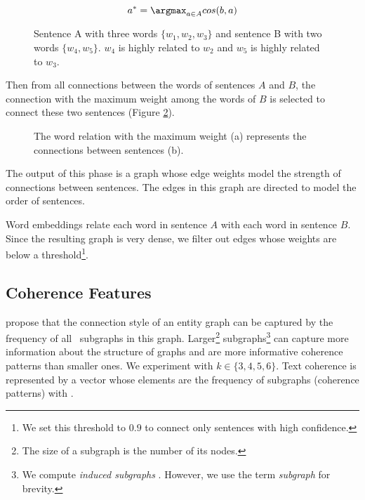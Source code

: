 \begin{equation*}
a^{*}= \argmax_{a\in A}cos(b,a)
\end{equation*}

\begin{figure}[!ht]
\centering
\small
%
\caption{Sentence A with three words $\lbrace w_1,w_2,w_3 \rbrace$ and
  sentence B with two words $\lbrace w_4,w_5 \rbrace$. $w_4$ is highly
  related to $w_2$ and $w_5$ is highly related to $w_3$.} 
\label{f:wrd_rel}
\end{figure}



Then from all connections between the words of sentences $A$ and $B$,
the connection with the maximum weight among the words of $B$ is
selected to connect these two sentences (Figure \ref{f:sent_rel}).

\begin{figure}[!ht]
\centering
\small
%
\caption{The word relation with the maximum weight (a) represents the connections between sentences (b).}
\label{f:sent_rel}
\end{figure}

The output of this phase is a graph whose edge weights model the
strength of connections between sentences. The edges in this graph are
directed to model the order of sentences.

Word embeddings relate each word in sentence $A$ with each word in
sentence $B$. Since the resulting graph is very dense, we filter
out edges whose weights are below a
threshold\footnote{We set this threshold to $0.9$ to connect only
  sentences with high confidence.}.


\subsection{Coherence Features} 
%
 propose that the connection style of an entity
graph can be captured by the frequency of all \knode\ subgraphs in
this graph. Larger\footnote{The size of a subgraph is the number of
  its nodes.} subgraphs\footnote{We compute \emph{induced
    subgraphs} \cite{mesgar15}. However, we use the term
  \emph{subgraph} for brevity.} can capture more information about the
structure of graphs and are more informative coherence patterns than
smaller ones. We experiment with $k \in \{3,4,5,6\}$. Text coherence is
represented by a vector whose elements are the frequency of subgraphs
(coherence patterns) with \knode.

